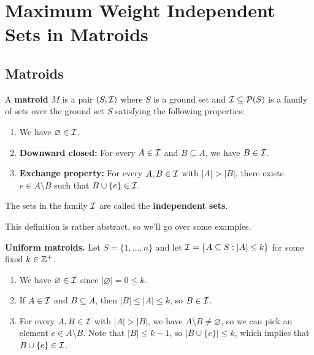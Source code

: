 \section{Maximum Weight Independent Sets in Matroids}\label{sec:4}

\subsection{Matroids}\label{subsec:4.1}
A {\bf matroid} $M$ is a pair $(S, {\cal I})$ where $S$ is a ground set 
and ${\cal I} \subseteq {\cal P}(S)$ is a family of sets over the 
ground set $S$ satisfying the following properties:
\begin{enumerate}[(1)]
    \item We have $\varnothing \in {\cal I}$.
    \item {\bf Downward closed:} For every $A \in {\cal I}$ and $B \subseteq A$, 
    we have $B \in {\cal I}$. 
    \item {\bf Exchange property:} For every $A, B \in {\cal I}$ with 
    $|A| > |B|$, there exists $e \in A \setminus B$ such that $B \cup \{e\} \in {\cal I}$. 
\end{enumerate}
The sets in the family ${\cal I}$ are called the {\bf independent sets}.

This definition is rather abstract, so we'll go over some examples. 

{\bf Uniform matroids.} Let $S = \{1, \dots, n\}$ and let ${\cal I} = 
\{A \subseteq S : |A| \leq k\}$ for some fixed $k \in \mathbb{Z}^+$. 
\begin{enumerate}[(1)]
    \item We have $\varnothing \in {\cal I}$ since $|\varnothing| = 0 \leq k$. 
    \item If $A \in {\cal I}$ and $B \subseteq A$, then $|B| \leq |A| \leq k$, 
    so $B \in {\cal I}$. 
    \item For every $A, B \in {\cal I}$ with $|A| > |B|$, we have 
    $A \setminus B \neq \varnothing$, so we can pick an element $e \in A 
    \setminus B$. Note that $|B| \leq k-1$, so $|B \cup \{e\}| \leq k$, 
    which implies that $B \cup \{e\} \in {\cal I}$. 
\end{enumerate}

